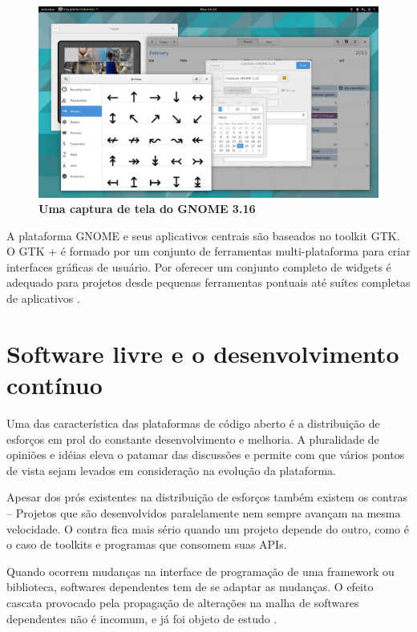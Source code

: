 \begin{figure}[htb]
  \begin{center}
    \label{mclasen-new-apps}
    \caption{\textbf{Uma captura de tela do GNOME 3.16}}
    \includegraphics [width=\textwidth]{image/mclasen-new-apps.png}
  \end{center}
\end{figure}

A plataforma GNOME e seus aplicativos centrais são baseados no toolkit GTK. O
GTK + é formado por um conjunto de ferramentas multi-plataforma para criar
interfaces gráficas de usuário. Por oferecer um conjunto completo de widgets é
adequado para projetos desde pequenas ferramentas pontuais até suítes completas
de aplicativos \cite{gtk-org}.

\section{Software livre e o desenvolvimento contínuo}

Uma das característica das plataformas de código aberto é a distribuição de
esforços em prol do constante desenvolvimento e melhoria. A pluralidade de
opiniões e idéias eleva o patamar das discussões e permite com que vários pontos
de vista sejam levados em consideração na evolução da plataforma.

Apesar dos prós existentes na distribuição de esforços também existem os contras
-- Projetos que são desenvolvidos paralelamente nem sempre avançam na mesma
velocidade. O contra fica mais sério quando um projeto depende do outro, como é
o caso de toolkits e programas que consomem suas APIs.

Quando ocorrem mudanças na interface de programação de uma framework ou
biblioteca, softwares dependentes tem de se adaptar as mudanças. O efeito
cascata provocado pela propagação de alterações na malha de softwares
dependentes não é incomum, e já foi objeto de estudo \cite{yau1978ripple}.

